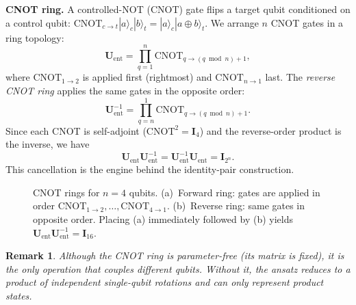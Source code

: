 \documentclass[11pt]{article}
\newcommand{\CNOT}{\mathrm{CNOT}}
\theoremstyle{plain}
\theoremstyle{plain}
\newtheorem{remark}[theorem]{Remark}
\begin{document}
\medskip\noindent\textbf{CNOT ring.}
A controlled-NOT (CNOT) gate flips a target qubit conditioned on a
control qubit:
$\CNOT_{c\to t}|a\rangle_c|b\rangle_t=|a\rangle_c|a\oplus b\rangle_t$.
We arrange $n$ CNOT gates in a ring topology:
\begin{equation}\label{eq:cnot_ring}
  \mathbf{U}_{\mathrm{ent}}
  =\prod_{q=1}^{n}\CNOT_{q\to(q\bmod n)+1},
\end{equation}
where $\CNOT_{1\to 2}$ is applied first (rightmost) and
$\CNOT_{n\to 1}$ last.  The \emph{reverse CNOT ring} applies the same
gates in the opposite order:
\begin{equation}\label{eq:cnot_ring_rev}
  \mathbf{U}_{\mathrm{ent}}^{-1}
  =\prod_{q=n}^{1}\CNOT_{q\to(q\bmod n)+1}.
\end{equation}
Since each CNOT is self-adjoint ($\CNOT^2=\mathbf{I}_4$) and the reverse-order
product is the inverse, we have
\begin{equation}\label{eq:cnot_cancel}
  \mathbf{U}_{\mathrm{ent}} \mathbf{U}_{\mathrm{ent}}^{-1}
  =\mathbf{U}_{\mathrm{ent}}^{-1} \mathbf{U}_{\mathrm{ent}}=\mathbf{I}_{2^n}.
\end{equation}
This cancellation is the engine behind the identity-pair construction.
\begin{figure}[t]
\centering
{}\hspace{0.8cm}
\caption{CNOT rings for $n=4$ qubits.  (a)~Forward ring: gates are
applied in order $\CNOT_{1\to 2},\ldots,\CNOT_{4\to 1}$.
(b)~Reverse ring: same gates in opposite order.  Placing (a) immediately
followed by (b) yields $\mathbf{U}_{\mathrm{ent}} \mathbf{U}_{\mathrm{ent}}^{-1}=\mathbf{I}_{16}$.}
\label{fig:cnot_ring}
\end{figure}
\begin{remark}
  Although the CNOT ring is parameter-free (its matrix is fixed), it
  is the \emph{only} operation that couples different qubits.  Without
  it, the ansatz reduces to a product of independent single-qubit
  rotations and can only represent product states.
\end{remark}
\end{document}
